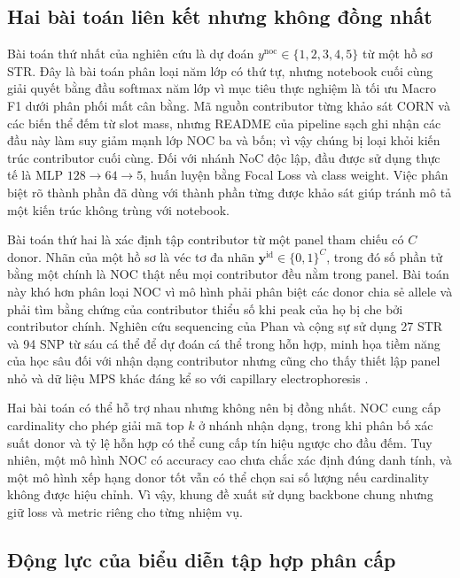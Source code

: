 \documentclass[12pt,a4paper]{article}
\begin{document}
\subsection{Hai bài toán liên kết nhưng không đồng nhất}

Bài toán thứ nhất của nghiên cứu là dự đoán \(y^{\mathrm{noc}}\in\{1,2,3,4,5\}\) từ một hồ sơ STR. Đây là bài toán phân loại năm lớp có thứ tự, nhưng notebook cuối cùng giải quyết bằng đầu softmax năm lớp vì mục tiêu thực nghiệm là tối ưu Macro F1 dưới phân phối mất cân bằng. Mã nguồn contributor từng khảo sát CORN và các biến thể đếm từ slot mass, nhưng README của pipeline sạch ghi nhận các đầu này làm suy giảm mạnh lớp NOC ba và bốn; vì vậy chúng bị loại khỏi kiến trúc contributor cuối cùng. Đối với nhánh NoC độc lập, đầu được sử dụng thực tế là MLP \(128\rightarrow64\rightarrow5\), huấn luyện bằng Focal Loss và class weight. Việc phân biệt rõ thành phần đã dùng với thành phần từng được khảo sát giúp tránh mô tả một kiến trúc không trùng với notebook.

Bài toán thứ hai là xác định tập contributor từ một panel tham chiếu có \(C\) donor. Nhãn của một hồ sơ là véc tơ đa nhãn \(\bm{y}^{\mathrm{id}}\in\{0,1\}^{C}\), trong đó số phần tử bằng một chính là NOC thật nếu mọi contributor đều nằm trong panel. Bài toán này khó hơn phân loại NOC vì mô hình phải phân biệt các donor chia sẻ allele và phải tìm bằng chứng của contributor thiểu số khi peak của họ bị che bởi contributor chính. Nghiên cứu sequencing của Phan và cộng sự sử dụng 27 STR và 94 SNP từ sáu cá thể để dự đoán cá thể trong hỗn hợp, minh họa tiềm năng của học sâu đối với nhận dạng contributor nhưng cũng cho thấy thiết lập panel nhỏ và dữ liệu MPS khác đáng kể so với capillary electrophoresis \cite{phan2021}.

Hai bài toán có thể hỗ trợ nhau nhưng không nên bị đồng nhất. NOC cung cấp cardinality cho phép giải mã top \(k\) ở nhánh nhận dạng, trong khi phân bố xác suất donor và tỷ lệ hỗn hợp có thể cung cấp tín hiệu ngược cho đầu đếm. Tuy nhiên, một mô hình NOC có accuracy cao chưa chắc xác định đúng danh tính, và một mô hình xếp hạng donor tốt vẫn có thể chọn sai số lượng nếu cardinality không được hiệu chỉnh. Vì vậy, khung đề xuất sử dụng backbone chung nhưng giữ loss và metric riêng cho từng nhiệm vụ.

\subsection{Động lực của biểu diễn tập hợp phân cấp}
\end{document}

